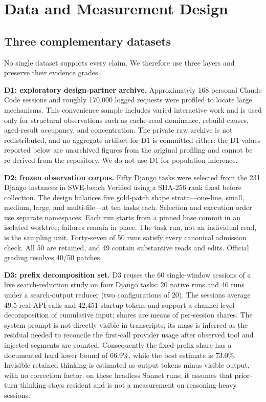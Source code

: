 \documentclass[10pt,twocolumn]{article}
\begin{document}
\section{Data and Measurement Design}

\subsection{Three complementary datasets}

No single dataset supports every claim.  We therefore use three layers and preserve their evidence
grades.

\textbf{D1: exploratory design-partner archive.}  Approximately 168 personal Claude Code sessions
and roughly 170,000 logged requests were profiled to locate large mechanisms.  This convenience sample
includes varied interactive work and is used only for structural observations such as cache-read
dominance, rebuild causes, aged-result occupancy, and concentration.  The private raw archive is not
redistributed, and no aggregate artifact for D1 is committed either: the D1 values reported below are
unarchived figures from the original profiling and cannot be re-derived from the repository.  We do not
use D1 for population inference.

\textbf{D2: frozen observation corpus.}  Fifty Django tasks were selected from the 231 Django
instances in SWE-bench Verified using a SHA-256 rank fixed before collection.  The design balances
five gold-patch shape strata---one-line, small, medium, large, and multi-file---at ten tasks each.
Selection and execution order use separate namespaces.  Each run starts from a pinned base commit in
an isolated worktree; failures remain in place.  The task run, not an individual read, is the sampling
unit.  Forty-seven of 50 runs satisfy every canonical admission check.  All 50 are retained, and 49
contain substantive reads and edits.  Official grading resolves 40/50 patches.

\textbf{D3: prefix decomposition set.}  D3 reuses the 60 single-window sessions of a live
search-reduction study on four Django tasks: 20 native runs and 40 runs under a search-output reducer
(two configurations of 20).  The sessions average 49.5 real API calls and 42,451 startup tokens and
support a channel-level decomposition of cumulative input; shares are means of per-session shares.
The system prompt is not directly visible in transcripts; its mass is inferred as the residual needed
to reconcile the first-call provider usage after observed tool and injected segments are counted.
Consequently the fixed-prefix share has a documented hard lower bound of 66.9\%, while the best
estimate is 73.0\%.  Invisible retained thinking is estimated as output tokens minus visible output,
with no correction factor, on these headless Sonnet runs; it assumes that prior-turn thinking stays
resident and is not a measurement on reasoning-heavy sessions.
\end{document}
